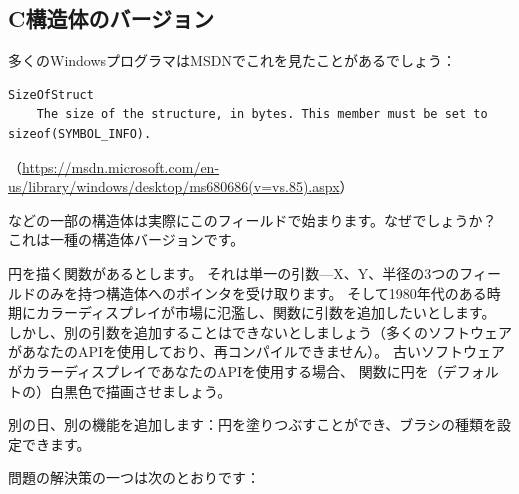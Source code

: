 \subsection{C構造体のバージョン}

多くのWindowsプログラマはMSDNでこれを見たことがあるでしょう：

\begin{lstlisting}
SizeOfStruct
    The size of the structure, in bytes. This member must be set to sizeof(SYMBOL_INFO).
\end{lstlisting}

（\url{https://msdn.microsoft.com/en-us/library/windows/desktop/ms680686(v=vs.85).aspx}）

などの一部の構造体は実際にこのフィールドで始まります。なぜでしょうか？
これは一種の構造体バージョンです。

円を描く関数があるとします。
それは単一の引数---X、Y、半径の3つのフィールドのみを持つ構造体へのポインタを受け取ります。
そして1980年代のある時期にカラーディスプレイが市場に氾濫し、関数に引数を追加したいとします。
しかし、別の引数を追加することはできないとしましょう（多くのソフトウェアがあなたの\ac{API}を使用しており、再コンパイルできません）。
古いソフトウェアがカラーディスプレイであなたの\ac{API}を使用する場合、
関数に円を（デフォルトの）白黒色で描画させましょう。

別の日、別の機能を追加します：円を塗りつぶすことができ、ブラシの種類を設定できます。

問題の解決策の一つは次のとおりです：

